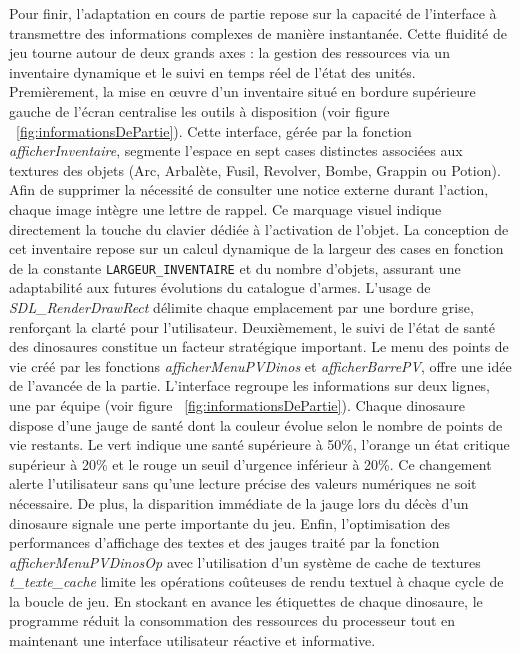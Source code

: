 \documentclass[11pt,a4paper]{article}
\begin{document}
Pour finir, l'adaptation en cours de partie repose sur la capacité de l'interface à transmettre des informations complexes de manière instantanée. Cette fluidité de jeu tourne autour de deux grands axes : la gestion des ressources via un inventaire dynamique et le suivi en temps réel de l'état des unités.
\\
Premièrement, la mise en œuvre d'un inventaire situé en bordure supérieure gauche de l'écran centralise les outils à disposition (voir figure  ~\ref{fig:informationsDePartie}). Cette interface, gérée par la fonction \textit{\mbox{afficherInventaire}}, segmente l'espace en sept cases distinctes associées aux textures des objets (Arc, Arbalète, Fusil, Revolver, Bombe, Grappin ou Potion). Afin de supprimer la nécessité de consulter une notice externe durant l'action, chaque image intègre une lettre de rappel. Ce marquage visuel indique directement la touche du clavier dédiée à l'activation de l'objet. La conception de cet inventaire repose sur un calcul dynamique de la largeur des cases en fonction de la constante \texttt{\mbox{LARGEUR\_INVENTAIRE}} et du nombre d'objets, assurant une adaptabilité aux futures évolutions du catalogue d'armes. L'usage de \textit{\mbox{SDL\_RenderDrawRect}} délimite chaque emplacement par une bordure grise, renforçant la clarté pour l'utilisateur.
Deuxièmement, le suivi de l'état de santé des dinosaures constitue un facteur stratégique important. Le menu des points de vie créé par les fonctions \textit{\mbox{afficherMenuPVDinos}} et \textit{\mbox{afficherBarrePV}}, offre une idée de l'avancée de la partie. L'interface regroupe les informations sur deux lignes, une par équipe (voir figure  ~\ref{fig:informationsDePartie}). Chaque dinosaure dispose d'une jauge de santé dont la couleur évolue selon le nombre de points de vie restants. Le vert indique une santé supérieure à 50\%, l'orange un état critique supérieur à 20\% et le rouge un seuil d'urgence inférieur à 20\%. Ce changement alerte l'utilisateur sans qu'une lecture précise des valeurs numériques ne soit nécessaire. De plus, la disparition immédiate de la jauge lors du décès d'un dinosaure signale une perte importante du jeu.
Enfin, l'optimisation des performances d'affichage des textes et des jauges traité par la fonction \textit{\mbox{afficherMenuPVDinosOp}} avec l'utilisation d'un système de cache de textures \textit{\mbox{t\_texte\_cache}} limite les opérations coûteuses de rendu textuel à chaque cycle de la boucle de jeu. En stockant en avance les étiquettes de chaque dinosaure, le programme réduit la consommation des ressources du processeur tout en maintenant une interface utilisateur réactive et informative.
\end{document}
